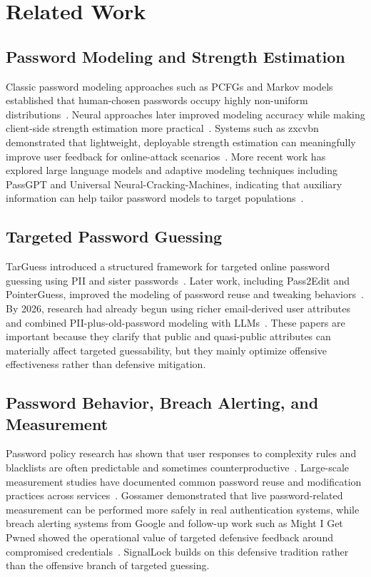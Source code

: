 \documentclass[11pt]{article}
\begin{document}
\section{Related Work}
\subsection{Password Modeling and Strength Estimation}
Classic password modeling approaches such as PCFGs and Markov models established that human-chosen passwords occupy highly non-uniform distributions~\cite{weir2009pcfg}. Neural approaches later improved modeling accuracy while making client-side strength estimation more practical~\cite{melicher2016neural}. Systems such as zxcvbn demonstrated that lightweight, deployable strength estimation can meaningfully improve user feedback for online-attack scenarios~\cite{wheeler2016zxcvbn}. More recent work has explored large language models and adaptive modeling techniques including PassGPT and Universal Neural-Cracking-Machines, indicating that auxiliary information can help tailor password models to target populations~\cite{passgpt2024,universalmachines2024}.

\subsection{Targeted Password Guessing}
TarGuess introduced a structured framework for targeted online password guessing using PII and sister passwords~\cite{targuess2016}. Later work, including Pass2Edit and PointerGuess, improved the modeling of password reuse and tweaking behaviors~\cite{pass2edit2023,ptrguess2024}. By 2026, research had already begun using richer email-derived user attributes and combined PII-plus-old-password modeling with LLMs~\cite{dtu2026email,passglm2026}. These papers are important because they clarify that public and quasi-public attributes can materially affect targeted guessability, but they mainly optimize offensive effectiveness rather than defensive mitigation.

\subsection{Password Behavior, Breach Alerting, and Measurement}
Password policy research has shown that user responses to complexity rules and blacklists are often predictable and sometimes counterproductive~\cite{egelman2011passwords,habib2017blacklists}. Large-scale measurement studies have documented common password reuse and modification practices across services~\cite{domino2018}. Gossamer demonstrated that live password-related measurement can be performed more safely in real authentication systems, while breach alerting systems from Google and follow-up work such as Might I Get Pwned showed the operational value of targeted defensive feedback around compromised credentials~\cite{gossamer2022,google2019breachalert,migp2022}. SignalLock builds on this defensive tradition rather than the offensive branch of targeted guessing.
\end{document}
